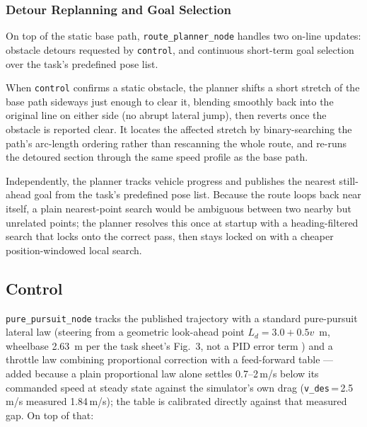 \documentclass[10pt,twocolumn]{article}
\begin{document}
\subsubsection{Detour Replanning and Goal Selection}
\label{sec:detour-goal-selection}

On top of the static base path, \texttt{route\_planner\_node} handles two
on-line updates: obstacle detours requested by \texttt{control}, and
continuous short-term goal selection over the task's predefined pose
list.

When \texttt{control} confirms a static obstacle, the planner shifts a
short stretch of the base path sideways just enough to clear it,
blending smoothly back into the original line on either side (no abrupt
lateral jump), then reverts once the obstacle is reported clear. It
locates the affected stretch by binary-searching the path's arc-length
ordering rather than rescanning the whole route, and re-runs the
detoured section through the same speed profile as the base path.

Independently, the planner tracks vehicle progress and publishes the
nearest still-ahead goal from the task's predefined pose list. Because
the route loops back near itself, a plain nearest-point search would be
ambiguous between two nearby but unrelated points; the planner resolves
this once at startup with a heading-filtered search that locks onto the
correct pass, then stays locked on with a cheaper position-windowed
local search.

\subsection{Control}
\label{sec:control}

\texttt{pure\_pursuit\_node} tracks the published trajectory with a
standard pure-pursuit lateral law (steering from a geometric look-ahead
point $L_d = 3.0 + 0.5v$~m, wheelbase 2.63~m per the task sheet's
Fig.~3, not a PID error term \cite{coulter1992}) and a throttle law
combining proportional correction with a feed-forward table --- added
because a plain proportional law alone settles 0.7--2\,m/s below its
commanded speed at steady state against the simulator's own drag
(\texttt{v\_des}\,=\,2.5\,m/s measured 1.84\,m/s); the table is
calibrated directly against that measured gap. On top of that:
\end{document}
